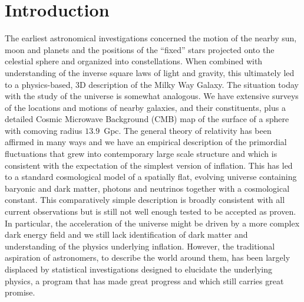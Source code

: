 \documentclass[useAMS,usenatbib,a4paper]{mn2e}
\begin{document}
\section{Introduction}
The earliest astronomical investigations concerned the motion of the nearby sun, moon and planets  and the positions of the ``fixed'' stars projected onto the celestial sphere and organized into constellations. When combined with understanding of the inverse square laws of light and gravity, this ultimately led to a physics-based, 3D description of the Milky Way Galaxy. The situation today with the study of the universe is somewhat analogous. We have extensive surveys of the locations and motions of nearby galaxies, and their constituents, plus a detailed Cosmic Microwave Background (CMB) map of the surface of a sphere with comoving radius $13.9$~Gpc. The general theory of relativity has been affirmed in many ways and we have an empirical description of the primordial fluctuations that grew into contemporary large scale structure and which is consistent with the expectation of the simplest version of inflation. This has led to a standard cosmological model of a spatially flat, evolving universe containing baryonic and dark matter, photons and neutrinos together with a cosmological constant. This comparatively simple description is broadly consistent with all current observations but is still not well enough tested to be accepted as proven. In particular, the acceleration of the universe might be driven by a more complex dark energy field and we still lack identification of dark matter and understanding of the physics underlying inflation. However, the traditional aspiration of astronomers, to describe the world around them, has been largely displaced by statistical investigations designed to elucidate the underlying physics, a program that has made great progress and which still carries great promise.
\end{document}
